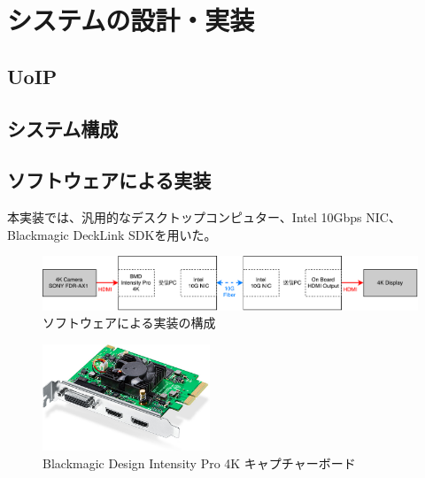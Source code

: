 \chapter{システムの設計・実装}
\label{chap:implementation}


\section{UoIP} %

\section{システム構成}



\section{ソフトウェアによる実装}

本実装では、汎用的なデスクトップコンピュター、Intel 10Gbps NIC、
Blackmagic DeckLink SDK\cite{bmd-decklink-sdk}を用いた。

\begin{figure}[htbp]
    \begin{center}
        \includegraphics[bb=0 0 841 121,width=15.5cm]{img/software-implement-flow.pdf}
    \end{center}
    \caption{ソフトウェアによる実装の構成}
    \label{fig:software-implement-flow}
\end{figure}

\begin{figure}[htbp]
    \begin{center}
        \includegraphics[bb=0 0 644 410,width=5cm]{img/bmd-intensity-pro-4k.jpg}
    \end{center}
    \caption{Blackmagic Design Intensity Pro 4K キャプチャーボード}
    \label{fig:ted-4k-fmc-card}
\end{figure}

